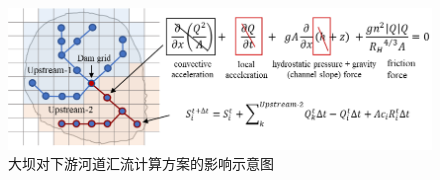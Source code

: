 {
\begin{figure}[htbp]
\centering
\includegraphics{Figures/陆地表面的水分循环/大坝对下游河道汇流计算方案的影响示意图.png}
\caption{大坝对下游河道汇流计算方案的影响示意图}
\label{fig:大坝对下游河道汇流计算方案的影响示意图}
\end{figure}
}
